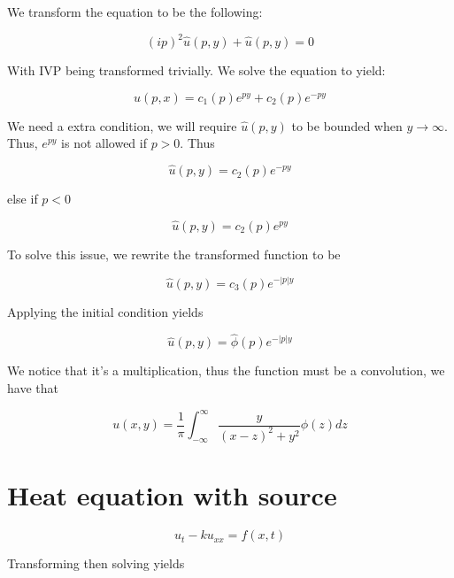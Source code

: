 \documentclass{article}
\newtheorem{one minute paper}[theorem]{One Minute Paper}
\begin{document}
We transform the equation to be the following:

\begin{equation}
    (ip)^2\widehat{u}(p,y) + \widehat{u}(p,y) = 0
\end{equation}

With IVP being transformed trivially. We solve the equation to yield:

\begin{equation}
    u(p,x) = c_1(p)e^{p y} + c_2(p)e^{-p y}
\end{equation}

We need a extra condition, we will require $\widehat{u}(p,y)$ to be bounded when $y \rightarrow \infty$. Thus, $e^{py}$ is not allowed if $p > 0$. Thus

\begin{equation}
    \widehat{u}(p,y) = c_2(p)e^{-py}
\end{equation}

else if $p < 0$

\begin{equation}
    \widehat{u}(p,y) = c_2(p)e^{py}
\end{equation}

To solve this issue, we rewrite the transformed function to be 

\begin{equation}
    \widehat{u}(p,y) = c_3(p)e^{-|p|y}
\end{equation}

Applying the initial condition yields

\begin{equation}
    \widehat{u}(p,y) = \widehat{\phi}(p)e^{-|p|y}
\end{equation}

We notice that it's a multiplication, thus the function must be a convolution, we have that 

\begin{equation}
    u(x,y) = \frac{1}{\pi}\int_{-\infty}^{\infty}\frac{y}{(x-z)^2 + y^2}\phi(z)dz
\end{equation}

\section*{Heat equation with source}

\begin{equation}
    u_t - ku_{xx} = f(x,t)
\end{equation}

Transforming then solving yields 

\begin{equation}
    
\end{equation}
\end{document}
